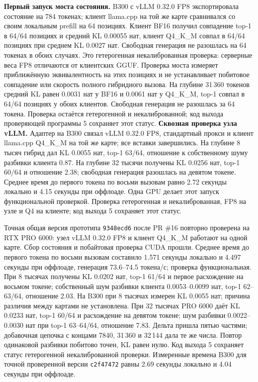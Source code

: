 \textbf{Первый запуск моста состояния.} B300 с vLLM 0.32.0 FP8 экспортировала состояние на
784 токенах; клиент llama.cpp на той же карте сравнивался со своим локальным prefill на 64 позициях.
Клиент BF16 получил совпадение top-1 в 64/64 позициях и средний KL 0.00055 нат,
клиент Q4\_K\_M совпал в 64/64 позициях при среднем KL 0.0027 нат.
Свободная генерация не разошлась на 64 токенах в обоих случаях. Это гетерогенная некалиброванная
проверка: серверные веса FP8 отличаются от клиентских GGUF. Проверка моста измеряет приближённую эквивалентность
на этих позициях и не устанавливает побитовое совпадение или скорость полного гибридного вызова.
На глубине 31\,360 токенов средний KL равен 0.0031 нат у BF16 и 0.0061 нат у Q4\_K\_M, top-1 совпал в 64/64 позициях у обоих клиентов.
Свободная генерация не разошлась за 64 токена. Проверка остаётся гетерогенной и некалиброванной;
код выхода проверяющей программы 5 сохраняет этот статус.
\textbf{Сквозная проверка узла vLLM.} Адаптер на B300 связал vLLM 0.32.0 FP8,
стандартный прокси и клиент llama.cpp Q4\_K\_M на той же карте; все вставки завершились.
На глубине 8 тысяч гибрид дал KL 0.0055 нат, top-1 63/64, отношение к собственному шуму разбивки клиента 0.87.
На глубине 32 тысячи получены KL 0.0256 нат, top-1 60/64 и отношение 2.38;
свободная генерация разошлась на девятом токене. Среднее время до первого токена по восьми вызовам
равно 2.72 секунды локально и 4.15 секунды при оффлоаде. Одна GPU делает этот запуск функциональной проверкой.
Проверка гетерогенная и некалиброванная, FP8 на узле и Q4 на клиенте; код выхода 5 сохраняет этот статус.

Точная общая версия прототипа \texttt{9348ecd6} после PR \#16 повторно проверена на RTX PRO 6000:
узел vLLM 0.32.0 FP8 и клиент Q4\_K\_M работают на одной карте. Сбор состояния и побайтовая
проверка CUDA прошли. Среднее время до первого токена по восьми вызовам составило 1.571 секунды
локально и 4.497 секунды при оффлоаде, генерация 73.6--74.5 токена/с; проверка функциональная.
При 8 тысячах получены KL 0.0202 нат, top-1 61/64 и первое расхождение на восьмом токене;
собственный шум разбивки клиента 0.0053--0.0099 нат, top-1 62--63/64, отношение 2.03.
На B300 при 8 тысячах измерен KL 0.0055 нат; причина различия между картами не установлена.
При 32 тысячах PRO 6000 даёт KL 0.0233 нат, top-1 60/64 и расхождение на девятом токене;
шум разбивки 0.0022--0.0030 нат при top-1 63--64/64, отношение 7.83.
Дельта пришла пятью частями; добавочная цепочка с концами 7840, 31\,360 и 32\,144 дала те же числа.
Повтор одинаковой разбивки побитово точен, KL равен нулю. Код выхода 5 сохраняет статус
гетерогенной некалиброванной проверки. Измеренные времена B300 для точной проверенной версии
\texttt{c2f47472} равны 2.69 секунды локально и 4.04 секунды при оффлоаде.

